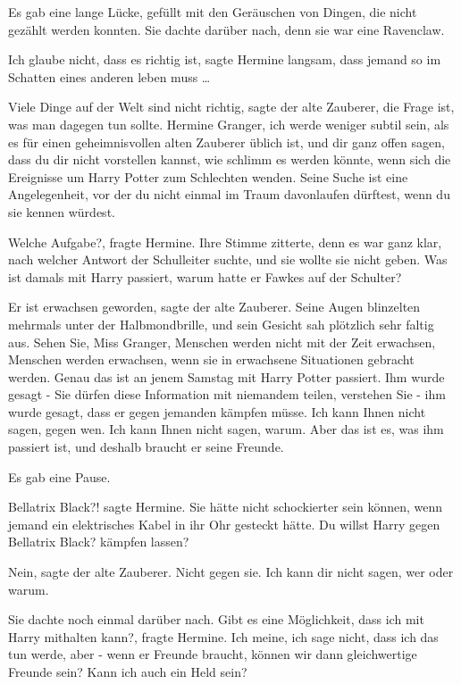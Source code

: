 Es gab eine lange Lücke, gefüllt mit den Geräuschen von Dingen, die nicht
gezählt werden konnten. Sie dachte darüber nach, denn sie war eine Ravenclaw.

\glqq{}Ich glaube nicht, dass es richtig ist\grqq{}, sagte Hermine langsam, \glqq{}
dass jemand so im Schatten eines anderen leben muss …\grqq{}

\glqq{}Viele Dinge auf der Welt sind nicht richtig\grqq{}, sagte der alte
Zauberer, \glqq{}die Frage ist, was man dagegen tun sollte. Hermine Granger, ich
werde weniger subtil sein, als es für einen geheimnisvollen alten Zauberer
üblich ist, und dir ganz offen sagen, dass du dir nicht vorstellen kannst, wie
schlimm es werden könnte, wenn sich die Ereignisse um Harry Potter zum
Schlechten wenden. Seine Suche ist eine Angelegenheit, vor der du nicht einmal
im Traum davonlaufen dürftest, wenn du sie kennen würdest.\grqq{}

\glqq{}Welche Aufgabe?\grqq{}, fragte Hermine. Ihre Stimme zitterte, denn es war
ganz klar, nach welcher Antwort der Schulleiter suchte, und sie wollte sie nicht
geben. \glqq{}Was ist damals mit Harry passiert, warum hatte er Fawkes auf der
Schulter?\grqq{}

\glqq{}Er ist erwachsen geworden\grqq{}, sagte der alte Zauberer. Seine Augen
blinzelten mehrmals unter der Halbmondbrille, und sein Gesicht sah plötzlich
sehr faltig aus. \glqq{}Sehen Sie, Miss Granger, Menschen werden nicht mit der
Zeit erwachsen, Menschen werden erwachsen, wenn sie in erwachsene Situationen
gebracht werden. Genau das ist an jenem Samstag mit Harry Potter passiert. Ihm
wurde gesagt - Sie dürfen diese Information mit niemandem teilen, verstehen Sie
- ihm wurde gesagt, dass er gegen jemanden kämpfen müsse. Ich kann Ihnen nicht
sagen, gegen wen. Ich kann Ihnen nicht sagen, warum. Aber das ist es, was ihm
passiert ist, und deshalb braucht er seine Freunde.\grqq{}

Es gab eine Pause.

\glqq{}Bellatrix Black?!\grqq{} sagte Hermine. Sie hätte nicht schockierter sein
können, wenn jemand ein elektrisches Kabel in ihr Ohr gesteckt hätte. \glqq{}Du
willst Harry gegen Bellatrix Black? kämpfen lassen?\grqq{}

\glqq{}Nein\grqq{}, sagte der alte Zauberer. \glqq{}Nicht gegen sie. Ich kann dir
nicht sagen, wer oder warum.\grqq{}

Sie dachte noch einmal darüber nach. \glqq{}Gibt es eine Möglichkeit, dass ich
mit Harry mithalten kann?\grqq{}, fragte Hermine. \glqq{}Ich meine, ich sage
nicht, dass ich das tun werde, aber - wenn er Freunde braucht, können wir dann
gleichwertige Freunde sein? Kann ich auch ein Held sein?\grqq{}

